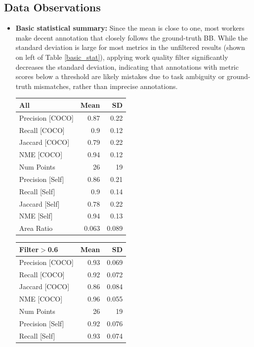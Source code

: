 \documentclass[12pt]{article}
\begin{document}
\subsection{Data Observations}
\begin{itemize}
\item \textbf{Basic statistical summary:}
Since the mean is close to one, most workers make decent annotation that closely follows the ground-truth BB.  While the standard deviation is large for most metrics in the unfiltered results (shown on left of Table \ref{basic_stat}), applying work quality filter significantly decreases the standard deviation, indicating that annotations with metric scores below a threshold are likely mistakes due to task ambiguity or ground-truth mismatches, rather than imprecise annotations.
\begin{table}[h]
\centering
\begin{tabular}{lrr}
\hline
 All              &   Mean &     SD \\
\hline
 Precision [COCO] &  0.87  &  0.22  \\
 Recall [COCO]    &  0.9   &  0.12  \\
 Jaccard [COCO]   &  0.79  &  0.22  \\
 NME [COCO]       &  0.94  &  0.12  \\
 Num Points       & 26     & 19     \\
 Precision [Self] &  0.86  &  0.21  \\
 Recall [Self]    &  0.9   &  0.14  \\
 Jaccard [Self]   &  0.78  &  0.22  \\
 NME [Self]       &  0.94  &  0.13  \\
 Area Ratio       &  0.063 &  0.089 \\
\hline
\end{tabular}
\begin{tabular}{lrr}
\hline
 Filter\ensuremath{>}0.6       &   Mean &     SD \\
\hline
 Precision [COCO] &  0.93  &  0.069 \\
 Recall [COCO]    &  0.92  &  0.072 \\
 Jaccard [COCO]   &  0.86  &  0.084 \\
 NME [COCO]       &  0.96  &  0.055 \\
 Num Points       & 26     & 19     \\
 Precision [Self] &  0.92  &  0.076 \\
 Recall [Self]    &  0.93  &  0.074 \\

\end{tabular}
\end{table}
\end{itemize}
\end{document}

